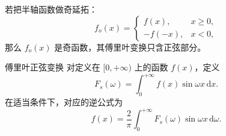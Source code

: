 若把半轴函数做奇延拓：
\begin{equation}
    f_o(x)=
    \begin{cases}
        f(x), & x\ge 0, \\
        -f(-x), & x<0,
    \end{cases}
\end{equation}
那么 $f_o(x)$ 是奇函数，其傅里叶变换只含正弦部分。

\begin{dingliyi}{傅里叶正弦变换}{}
对定义在 $[0,+\infty)$ 上的函数 $f(x)$，定义
\begin{equation}
    F_s(\omega)=\int_0^{+\infty} f(x)\sin \omega x\,\mathrm{d}x.
\end{equation}
在适当条件下，对应的逆公式为
\begin{equation}
    f(x)=\frac{2}{\pi}\int_0^{+\infty} F_s(\omega)\sin \omega x\,\mathrm{d}\omega.
\end{equation}
\end{dingliyi}

